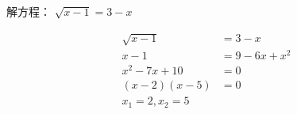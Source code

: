 \documentclass[answers]{exam}
\begin{document}
\begin{questions}
	\question 解方程： \( \sqrt{x - 1} = 3 - x \)
	\begin{solution}
		\begin{align*}
			\sqrt{x - 1}  & = 3 - x        \\
			x - 1         & = 9 - 6x + x^2 \\
			x^2 - 7x + 10 & = 0            \\
			(x-2)(x-5)    & = 0            \\
			x_1 = 2, x_2 = 5
		\end{align*}
	\end{solution}

\end{questions}
\end{document}
